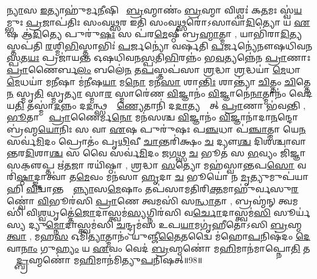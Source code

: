  \ul{𑌨𑍍𑌯𑌾}𑌸 \ul{𑌇}𑌤𑍍𑌯𑌾𑌹𑍁॑𑌰𑍍𑌮\ul{𑌨𑍀}𑌷𑌿𑌣𑍋᳚ \ul{𑌬𑍍𑌰}𑌹𑍍𑌮𑌾𑌣𑌂॑ \ul{𑌬𑍍𑌰}𑌹𑍍𑌮𑌾 𑌵𑌿𑌶𑍍𑌵𑌃॑ 𑌕\ul{𑌤}𑌮𑌃 𑌸𑍍𑌵॑\ul{𑌯}𑌮𑍍𑌭𑍁𑌃 \ul{𑌪𑍍𑌰}𑌜𑌾𑌪॑𑌤𑌿𑌃 𑌸𑌂𑌵\ul{𑌥𑍍𑌸}𑌰 𑌇𑌤𑌿॑ 𑌸𑌂𑌵\ul{𑌥𑍍𑌸}𑌰𑍋॑𑌽𑌸𑌾𑌵𑌾॑\ul{𑌦𑌿}𑌤𑍍𑌯𑍋 𑌯 \ul{𑌏}𑌷 𑌆॑\ul{𑌦𑌿}𑌤𑍍𑌯𑍇 𑌪𑍁𑌰𑍁॑\ul{𑌷𑌃} 𑌸 𑌪॑𑌰\ul{𑌮𑍇}𑌷𑍍𑌠𑍀 𑌬𑍍𑌰\ul{𑌹𑍍𑌮𑌾}𑌤𑍍𑌮𑌾 \sep
 𑌯𑌾𑌭𑌿॑𑌰𑌾\ul{𑌦𑌿}𑌤𑍍𑌯𑌸𑍍𑌤𑌪॑𑌤𑌿 \ul{𑌰}𑌶𑍍𑌮𑌿\ul{𑌭𑌿}𑌸𑍍𑌤𑌾𑌭𑌿𑌃॑ \ul{𑌪}𑌰𑍍𑌜𑌨𑍍𑌯𑍋॑ 𑌵𑌰𑍍\mbox{}𑌷𑌤𑌿 \ul{𑌪}𑌰𑍍𑌜𑌨𑍍𑌯𑍇॑𑌨𑍗𑌷𑌧𑌿𑌵𑌨\ul{𑌸𑍍𑌪}𑌤\ul{𑌯𑌃} 𑌪𑍍𑌰𑌜𑌾॑𑌯𑌨𑍍𑌤 𑌓𑌷𑌧𑌿𑌵𑌨\ul{𑌸𑍍𑌪}𑌤𑌿\ul{𑌭𑌿}𑌰𑌨𑍍𑌨𑌂॑ 𑌭\ul{𑌵}𑌤𑍍𑌯𑌨𑍍𑌨𑍇॑𑌨 \ul{𑌪𑍍𑌰𑌾}𑌣𑌾𑌃 \ul{𑌪𑍍𑌰𑌾}𑌣𑍈𑌰𑍍𑌬\ul{𑌲𑌂} 𑌬𑌲𑍇॑\ul{𑌨} 𑌤\ul{𑌪}𑌸𑍍𑌤𑌪॑𑌸𑌾 \ul{𑌶𑍍𑌰}𑌦𑍍𑌧𑌾 \ul{𑌶𑍍𑌰}𑌦𑍍𑌧𑌯𑌾॑ \ul{𑌮𑍇}𑌧𑌾 \ul{𑌮𑍇}𑌧𑌯𑌾॑ 𑌮\ul{𑌨𑍀}𑌷𑌾 𑌮॑\ul{𑌨𑍀}𑌷\ul{𑌯𑌾} 𑌮\ul{𑌨𑍋} 𑌮𑌨॑\ul{𑌸𑌾} 𑌶𑌾\ul{𑌨𑍍𑌤𑌿𑌃} 𑌶𑌾𑌨𑍍𑌤𑍍𑌯𑌾॑ \ul{𑌚𑌿}𑌤𑍍𑌤𑌂 \ul{𑌚𑌿}𑌤𑍍𑌤𑍇\ul{𑌨} 𑌸𑍍𑌮𑍃\ul{𑌤𑌿}\ul{} 𑌸𑍍𑌮𑍃\ul{𑌤𑍍𑌯𑌾} 𑌸𑍍𑌮𑌾\ul{𑌰}\ul{} 𑌸𑍍𑌮𑌾𑌰𑍇॑𑌣 \ul{𑌵𑌿}𑌜𑍍𑌞𑌾𑌨𑌂॑  \ul{𑌵𑌿}𑌜𑍍𑌞𑌾𑌨𑍇॑\ul{𑌨𑌾}𑌤𑍍𑌮𑌾𑌨𑌂॑ 𑌵𑍇𑌦𑌯\ul{𑌤𑌿} 𑌤𑌸𑍍𑌮𑌾॑\ul{𑌦}𑌨𑍍𑌨𑌂 𑌦\ul{𑌦}𑌨𑍍𑌥𑍍𑌸𑌰𑍍𑌵𑌾᳚\ul{𑌣𑍍𑌯𑍇}𑌤𑌾𑌨𑌿॑ 𑌦\ul{𑌦𑌾}𑌤𑍍𑌯𑌨𑍍𑌨𑌾᳚𑌤𑍍 \ul{𑌪𑍍𑌰𑌾}𑌣𑌾 𑌭॑𑌵𑌨𑍍𑌤𑌿 \sep
  \ul{𑌭𑍂}𑌤𑌾𑌨𑌾𑌂᳚ \ul{𑌪𑍍𑌰𑌾}𑌣𑍈𑌰𑍍𑌮\ul{𑌨𑍋} 𑌮𑌨॑𑌸𑌶𑍍𑌚 \ul{𑌵𑌿}𑌜𑍍𑌞𑌾𑌨𑌂॑  \ul{𑌵𑌿}𑌜𑍍𑌞𑌾𑌨𑌾॑𑌦𑌾\ul{𑌨}𑌨𑍍𑌦𑍋 𑌬𑍍𑌰॑𑌹𑍍𑌮\ul{𑌯𑍋}𑌨𑌿𑌃 𑌸 𑌵𑌾 \ul{𑌏}𑌷 𑌪𑍁𑌰𑍁॑𑌷𑌃 𑌪\ul{𑌞𑍍𑌚}𑌧𑌾 𑌪॑\ul{𑌞𑍍𑌚𑌾}𑌤𑍍𑌮𑌾 𑌯𑍇\ul{𑌨} 𑌸𑌰𑍍𑌵॑\ul{𑌮𑌿}𑌦𑌂 𑌪𑍍𑌰𑍋𑌤𑌂॑ 𑌪𑍃\ul{𑌥𑌿}𑌵𑍀 \ul{𑌚𑌾}𑌨𑍍𑌤𑌰𑌿॑𑌕𑍍𑌷𑌂 \ul{𑌚} 𑌦𑍍𑌯𑍗\ul{𑌶𑍍𑌚} 𑌦𑌿𑌶॑𑌶𑍍𑌚𑌾𑌵𑌾𑌨𑍍𑌤𑌰\ul{𑌦𑌿}𑌶𑌾\ul{𑌶𑍍𑌚} 𑌸 𑌵𑍈 𑌸𑌰𑍍𑌵॑\ul{𑌮𑌿}𑌦𑌂 𑌜\ul{𑌗}𑌥𑍍𑌸 \ul{𑌚} 𑌭𑍂𑌤॑ 𑌸 \ul{𑌭}𑌵𑍍𑌯𑌂 𑌜𑌿॑𑌜𑍍𑌞𑌾𑌸𑌕𑍢॒𑌪𑍍𑌤 𑌋॑\ul{𑌤}𑌜𑌾 𑌰𑌯𑌿॑𑌷𑍍𑌠𑌾 \sep
  \ul{𑌶𑍍𑌰}𑌦𑍍𑌧𑌾 \ul{𑌸}𑌤𑍍𑌯𑍋 𑌮𑌹॑𑌸𑍍𑌵𑌾\ul{𑌨𑍍𑌤}𑌪\ul{𑌸𑍋} 𑌵𑌰𑌿॑\ul{𑌷𑍍𑌠𑌾}𑌦𑍍𑌜𑍍𑌞𑌾𑌤𑍍𑌵𑌾॑ 𑌤\ul{𑌮𑍇}𑌵𑌂 𑌮𑌨॑𑌸𑌾 \ul{𑌹𑍃}𑌦𑌾 \ul{𑌚} 𑌭𑍂𑌯𑍋॑ 𑌨 \ul{𑌮𑍃}𑌤𑍍𑌯𑍁𑌮𑍁𑌪॑𑌯𑌾𑌹𑌿 \ul{𑌵𑌿}𑌦𑍍𑌵𑌾𑌨𑍍𑌤𑌸𑍍𑌮𑌾᳚\ul{𑌨𑍍𑌨𑍍𑌯𑌾}𑌸\ul{𑌮𑍇}𑌷𑌾𑌂 𑌤𑌪॑𑌸𑌾𑌮𑌤𑌿𑌰𑌿\ul{𑌕𑍍𑌤}𑌮𑌾𑌹𑍁॑𑌰𑍍𑌵𑌸𑍁\ul{𑌰}𑌣𑍍𑌵𑍋॑ \ul{𑌵𑌿}𑌭𑍂𑌰॑𑌸𑌿 \ul{𑌪𑍍𑌰𑌾}𑌣𑍇 𑌤𑍍𑌵𑌮𑌸𑌿॑ 𑌸\ul{𑌨𑍍𑌧𑌾}𑌤𑌾 \sep 
 𑌬𑍍𑌰𑌹𑍍𑌮॑𑌨𑍍 𑌤𑍍𑌵𑌮𑌸𑌿॑ 𑌵𑌿\ul{𑌶𑍍𑌵}𑌧𑍃𑌤𑍍𑌤𑍇॑\ul{𑌜𑍋}𑌦𑌾𑌸𑍍𑌤𑍍𑌵𑌮॑\ul{𑌸𑍍𑌯}𑌗𑍍𑌨𑌿𑌰॑𑌸𑌿 𑌵\ul{𑌰𑍍𑌚𑍋}𑌦𑌾𑌸𑍍𑌤𑍍𑌵𑌮॑\ul{𑌸𑌿} 𑌸𑍂𑌰𑍍𑌯॑𑌸𑍍𑌯 𑌦𑍍𑌯𑍁\ul{𑌮𑍍𑌨𑍋}𑌦𑌾𑌸𑍍𑌤𑍍𑌵𑌮॑𑌸𑌿 \ul{𑌚}𑌨𑍍𑌦𑍍𑌰𑌮॑𑌸 𑌉𑌪\ul{𑌯𑌾}𑌮𑌗𑍃॑𑌹𑍀𑌤𑍋𑌽𑌸𑌿 \ul{𑌬𑍍𑌰}𑌹𑍍𑌮𑌣𑍇᳚ \ul{𑌤𑍍𑌵𑌾} \sep
 𑌮𑌹\ul{𑌸} 𑌓𑌮𑌿\ul{𑌤𑍍𑌯𑌾}𑌤𑍍𑌮𑌾𑌨𑌂॑ 𑌯𑍁𑌞𑍍𑌜𑍀\ul{𑌤𑍈}𑌤𑌦𑍍𑌵𑍈 𑌮॑𑌹𑍋\ul{𑌪}𑌨𑌿𑌷॑𑌦𑌂 \ul{𑌦𑍇}𑌵𑌾\ul{𑌨𑌾𑌂} 𑌗𑍁\ul{𑌹𑍍𑌯𑌂} 𑌯 \ul{𑌏}𑌵𑌂 𑌵𑍇𑌦॑ \ul{𑌬𑍍𑌰}𑌹𑍍𑌮𑌣𑍋॑ 𑌮\ul{𑌹𑌿}𑌮𑌾𑌨॑𑌮𑌾𑌪𑍍𑌨𑍋\ul{𑌤𑌿} 𑌤𑌸𑍍𑌮𑌾᳚\ul{𑌦𑍍𑌬𑍍𑌰}𑌹𑍍𑌮𑌣𑍋॑ 𑌮\ul{𑌹𑌿}𑌮𑌾𑌨॑𑌮𑌿𑌤𑍍𑌯𑍁\ul{𑌪}𑌨𑌿𑌷𑌤𑍍॥98॥\anuvakamend



